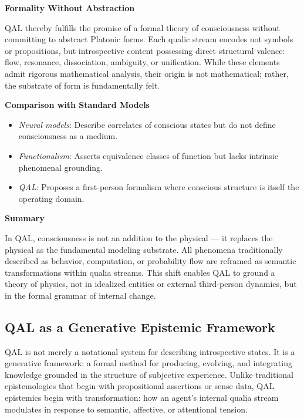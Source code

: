 \documentclass[11pt]{article}
\numberwithin{equation}{section} %
\begin{document}
\bigskip

\noindent\textbf{Formality Without Abstraction}

QAL thereby fulfills the promise of a formal theory of consciousness without committing to abstract Platonic forms. Each qualic stream encodes not symbols or propositions, but introspective content possessing direct structural valence: flow, resonance, dissociation, ambiguity, or unification. While these elements admit rigorous mathematical analysis, their origin is not mathematical; rather, the substrate of form is fundamentally felt.

\bigskip

\noindent\textbf{Comparison with Standard Models}

\begin{itemize}
\item \textit{Neural models}: Describe correlates of conscious states but do not define consciousness as a medium.
\item \textit{Functionalism}: Asserts equivalence classes of function but lacks intrinsic phenomenal grounding.
\item \textit{QAL}: Proposes a first-person formalism where conscious structure is itself the operating domain.
\end{itemize}

\bigskip

\noindent\textbf{Summary}

In QAL, consciousness is not an addition to the physical — it replaces the physical as the fundamental modeling substrate. All phenomena traditionally described as behavior, computation, or probability flow are reframed as semantic transformations within qualia streams. This shift enables QAL to ground a theory of physics, not in idealized entities or external third-person dynamics, but in the formal grammar of internal change.

\subsection{QAL as a Generative Epistemic Framework}

QAL is not merely a notational system for describing introspective states. It is a generative framework: a formal method for producing, evolving, and integrating knowledge grounded in the structure of subjective experience. Unlike traditional epistemologies that begin with propositional assertions or sense data, QAL epistemics begin with transformation: how an agent’s internal qualia stream modulates in response to semantic, affective, or attentional tension.
\end{document}
